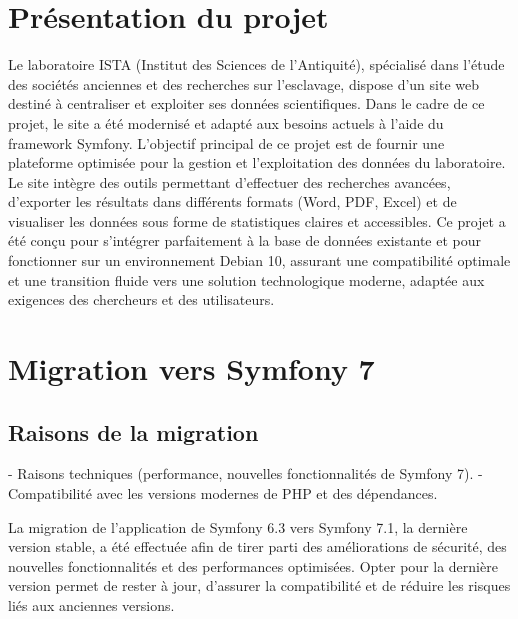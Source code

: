 \documentclass[12pt]{article}
\begin{document}
    \newpage


    \section{Présentation du projet}

    Le laboratoire ISTA (Institut des Sciences de l’Antiquité), spécialisé dans l’étude des sociétés anciennes et des recherches sur l’esclavage, dispose d’un site web destiné à centraliser et exploiter ses données scientifiques. Dans le cadre de ce projet, le site a été modernisé et adapté aux besoins actuels à l’aide du framework Symfony.
    \newline
    L’objectif principal de ce projet est de fournir une plateforme optimisée pour la gestion et l’exploitation des données du laboratoire. Le site intègre des outils permettant d’effectuer des recherches avancées, d’exporter les résultats dans différents formats (Word, PDF, Excel) et de visualiser les données sous forme de statistiques claires et accessibles.
    \newline
    Ce projet a été conçu pour s’intégrer parfaitement à la base de données existante et pour fonctionner sur un environnement Debian 10, assurant une compatibilité optimale et une transition fluide vers une solution technologique moderne, adaptée aux exigences des chercheurs et des utilisateurs.


    \section{Migration vers Symfony 7}

    \subsection{Raisons de la migration}
    - Raisons techniques (performance, nouvelles fonctionnalités de Symfony 7).
    - Compatibilité avec les versions modernes de PHP et des dépendances.

    La migration de l'application de Symfony 6.3 vers Symfony 7.1, la dernière version stable, a été effectuée afin de tirer parti des améliorations de sécurité, des nouvelles fonctionnalités et des performances optimisées. Opter pour la dernière version permet de rester à jour, d'assurer la compatibilité et de réduire les risques liés aux anciennes versions.
\end{document}
